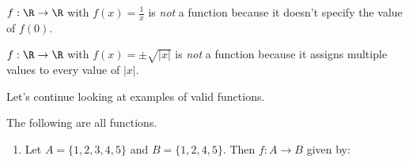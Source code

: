 \begin{example}
	$f: \R \rightarrow \R$ with $f(x) = \frac{1}{x}$ is \emph{not} a function because it doesn't specify the value of $f(0)$.

	$f: \R \rightarrow \R$ with $f(x) = \pm \sqrt{|x|}$ is \emph{not} a function because it assigns multiple values to every value of $|x|$.
\end{example}


Let's continue looking at examples of valid functions.

\begin{example}
	The following are all functions.
	\begin{enumerate}[label=(\roman*)]
		\item Let $A = \{1, 2, 3, 4, 5\}$ and $B = \{1, 2, 4, 5\}$. Then $f: A \rightarrow B$ given by:
		\begin{center}
			


\begin{tikzpicture}[x=0.75pt,y=0.75pt,yscale=-1,xscale=1]


\end{tikzpicture}
\end{center}
\end{enumerate}
\end{example}
